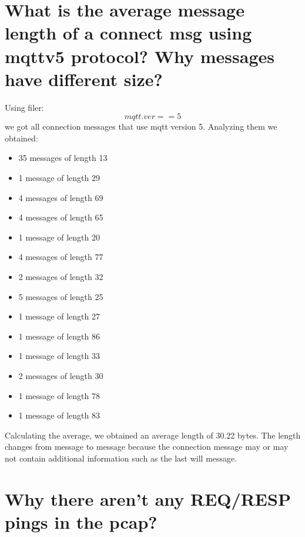 \documentclass{article}
\begin{document}
\section{What is the average message length of a connect msg
using mqttv5 protocol? Why messages have different
size?}
Using filer: \[ mqtt.ver == 5\] we got all connection messages that use mqtt version 5. \hfill \break
Analyzing them we obtained: 
\begin{itemize} 
   \item 35 messages of length 13
   \item 1 message of length 29
   \item 4 messages of length 69
   \item 4 messages of length 65
   \item 1 message of length 20
   \item 4 messages of length 77
   \item 2 messages of length 32
   \item 5 messages of length 25
   \item 1 message of length 27
   \item 1 message of length 86
   \item 1 message of length 33
   \item 2 messages of length 30
   \item 1 message of length 78
   \item 1 message of length 83
\end{itemize}
Calculating the average, we obtained an average length of 30.22 bytes. \hfill \break
The length changes from message to message because the connection message may or may not contain additional information such as the last will message.

\section{Why there aren’t any REQ/RESP pings in the pcap?}
\end{document}
